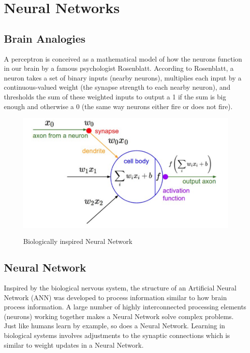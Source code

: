 \pagebreak

\section{Neural Networks}
\subsection{Brain Analogies}

A perceptron is conceived as a mathematical model of how the neurons function in our brain by a famous psychologist Rosenblatt. According to Rosenblatt, a neuron  takes a set of binary inputs (nearby neurons), multiplies each input by a continuous-valued weight (the synapse strength to each nearby neuron), and thresholds the sum of these weighted inputs to output a 1 if the sum is big enough and otherwise a 0 (the same way neurons either fire or does not fire).

\begin{figure}[H]
\begin{center}
\includegraphics[height=.28\textheight]{Chapter2/Figs/NeuralNetwork.png}
\label{fig:Neural_Network}
\caption{Biologically inspired Neural Network \cite{karparthy}}
\end{center}
\end{figure}

\subsection{Neural Network}

Inspired by the biological nervous system, the structure of an Artificial Neural Network (ANN) was developed to process information similar to how brain process information. A large number of highly interconnected processing elements (neurons) working together makes a Neural Network solve complex problems. Just like humans learn by example, so does a Neural Network. Learning in biological systems involves adjustments to the synaptic connections which is similar to weight updates in a Neural Network. 

